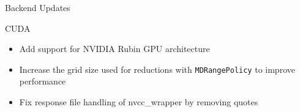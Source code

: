 
\begin{frame}[fragile]

  {\Huge Backend Updates}

  \vspace{10pt}

\end{frame}





%



\begin{frame}[fragile]

  {\Huge CUDA}
  \begin{itemize}
    \item Add support for NVIDIA Rubin GPU architecture
	\item Increase the grid size used for reductions with \texttt{MDRangePolicy} to improve performance
	\item Fix response file handling of nvcc\_wrapper by removing quotes
  \end{itemize}

\end{frame}

